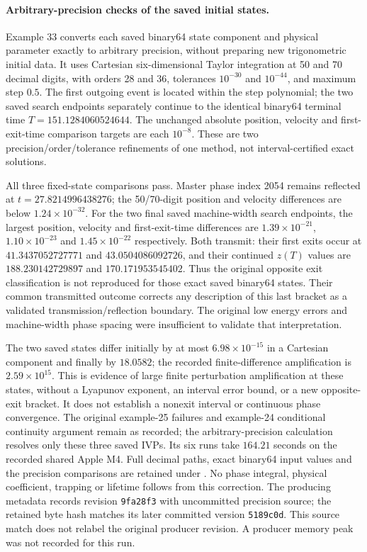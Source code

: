 \documentclass[11pt,letterpaper]{article}
\begin{document}
\paragraph{Arbitrary-precision checks of the saved initial states.}
Example 33 converts each saved binary64 state component and physical
parameter exactly to arbitrary precision, without preparing new
trigonometric initial data. It uses Cartesian six-dimensional Taylor
integration at 50 and 70 decimal digits, with orders 28 and 36,
tolerances $10^{-30}$ and $10^{-44}$, and maximum step $0.5$.
The first outgoing event is located within the step polynomial; the two
saved search endpoints separately continue to the identical binary64
terminal time $T=151.1284060524644$. The unchanged absolute position,
velocity and first-exit-time comparison targets are each $10^{-8}$.
These are two precision/order/tolerance refinements of one method, not
interval-certified exact solutions.

All three fixed-state comparisons pass. Master phase index 2054 remains
reflected at $t=27.8214996438276$; the 50/70-digit position and velocity
differences are below $1.24\times10^{-32}$. For the two final saved
machine-width search endpoints, the largest position, velocity and
first-exit-time differences are $1.39\times10^{-21}$,
$1.10\times10^{-23}$ and $1.45\times10^{-22}$ respectively. Both
transmit: their first exits occur at $41.3437052727771$ and
$43.0504086092726$, and their continued $z(T)$ values are
$188.230142729897$ and $170.171953545402$. Thus the original opposite
exit classification is not reproduced for those exact saved binary64
states. Their common transmitted outcome corrects any description of
this last bracket as a validated transmission/reflection boundary.
The original low energy errors and machine-width phase spacing were
insufficient to validate that interpretation.

The two saved states differ initially by at most
$6.98\times10^{-15}$ in a Cartesian component and finally by $18.0582$;
the recorded finite-difference amplification is $2.59\times10^{15}$.
This is evidence of large finite perturbation amplification at these
states, without a Lyapunov exponent, an interval error bound, or a new
opposite-exit bracket. It does not establish a nonexit interval or
continuous phase convergence. The original example-25 failures and
example-24 conditional continuity argument remain as recorded; the
arbitrary-precision calculation resolves only these three saved IVPs.
Its six runs take $164.21$ seconds on the recorded shared Apple M4.
Full decimal paths, exact binary64 input values and the precision
comparisons are retained under
. No phase integral,
physical coefficient, trapping or lifetime follows from this correction.
The producing metadata records revision \texttt{9fa28f3} with uncommitted
precision source; the retained byte hash matches its later committed
version \texttt{5189c0d}. This source match does not relabel the original
producer revision. A producer memory peak was not recorded for this run.
\end{document}
